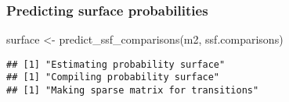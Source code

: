 \documentclass[
]{article}
\newenvironment{Shaded}{\begin{snugshade}}{\end{snugshade}}
\newcommand{\AttributeTok}[1]{\textcolor[rgb]{0.77,0.63,0.00}{#1}}
\newcommand{\ControlFlowTok}[1]{\textcolor[rgb]{0.13,0.29,0.53}{\textbf{#1}}}
\newcommand{\DecValTok}[1]{\textcolor[rgb]{0.00,0.00,0.81}{#1}}
\newcommand{\FunctionTok}[1]{\textcolor[rgb]{0.00,0.00,0.00}{#1}}
\newcommand{\NormalTok}[1]{#1}
\newcommand{\OtherTok}[1]{\textcolor[rgb]{0.56,0.35,0.01}{#1}}
\newcommand{\SpecialCharTok}[1]{\textcolor[rgb]{0.00,0.00,0.00}{#1}}
\begin{document}
\begin{Shaded}
\end{Shaded}

\hypertarget{predicting-surface-probabilities-1}{%
\subsubsection{Predicting surface
probabilities}\label{predicting-surface-probabilities-1}}

\begin{Shaded}
\begin{Highlighting}[]
\NormalTok{surface }\OtherTok{\textless{}{-}} \FunctionTok{predict\_ssf\_comparisons}\NormalTok{(m2, ssf.comparisons)}
\end{Highlighting}
\end{Shaded}

\begin{verbatim}
## [1] "Estimating probability surface"
## [1] "Compiling probability surface"
## [1] "Making sparse matrix for transitions"
\end{verbatim}
\end{document}
